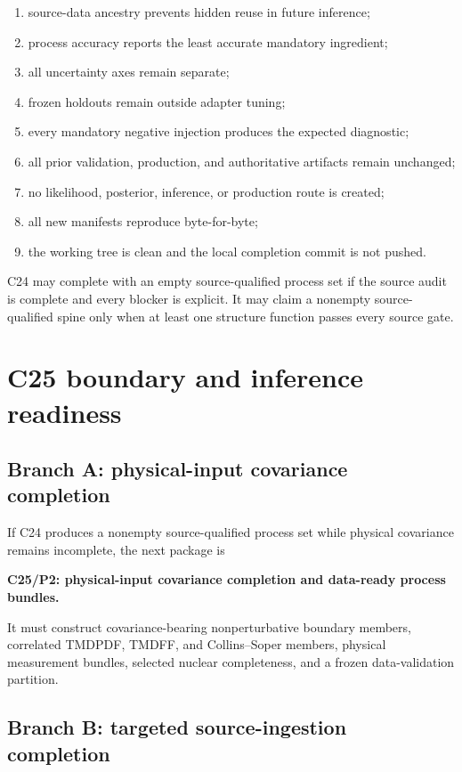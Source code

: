 \documentclass[11pt]{article}
\begin{document}
\begin{enumerate}
\item source-data ancestry prevents hidden reuse in future inference;
\item process accuracy reports the least accurate mandatory ingredient;
\item all uncertainty axes remain separate;
\item frozen holdouts remain outside adapter tuning;
\item every mandatory negative injection produces the expected diagnostic;
\item all prior validation, production, and authoritative artifacts remain unchanged;
\item no likelihood, posterior, inference, or production route is created;
\item all new manifests reproduce byte-for-byte;
\item the working tree is clean and the local completion commit is not pushed.
\end{enumerate}

C24 may complete with an empty source-qualified process set if the source audit is complete and every blocker is explicit.  It may claim a nonempty source-qualified spine only when at least one structure function passes every source gate.

\section{C25 boundary and inference readiness}
\label{sec:handoff}

\subsection{Branch A: physical-input covariance completion}

If C24 produces a nonempty source-qualified process set while physical covariance remains incomplete, the next package is
\begin{center}
\textbf{C25/P2: physical-input covariance completion and data-ready process bundles.}
\end{center}
It must construct covariance-bearing nonperturbative boundary members, correlated TMDPDF, TMDFF, and Collins--Soper members, physical measurement bundles, selected nuclear completeness, and a frozen data-validation partition.

\subsection{Branch B: targeted source-ingestion completion}
\end{document}
